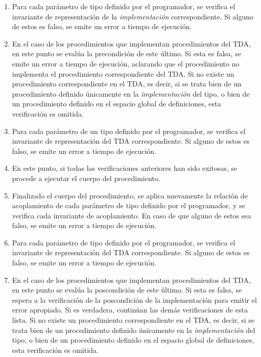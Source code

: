 {{\begin{enumerate}
  \item Para cada parámetro de tipo definido por el programador, se verifica
  el invariante de representación de la \textit{implementación} correspondiente.
  Si alguno de estos es falso, se emite un error a tiempo de ejecución.

  \item En el caso de los procedimientos que implementan procedimientos del TDA,
  en este punto se evalúa la precondición de este último. Si esta es falsa, se
  emite un error a tiempo de ejecución, aclarando que el procedimiento no
  implementa el procedimiento correspondiente del TDA. Si no existe un procedimiento
  correspondiente en el TDA, es decir, si se trata bien de un procedimiento
  definido únicamente en la \textit{implementación} del tipo, o bien de un
  procedimiento definido en el espacio global de definiciones, esta verificación
  es omitida.

  \item Para cada parámetro de un tipo definido por el programador, se verifica
  el invariante de representación del TDA correspondiente. Si alguno de estos es
  falso, se emite un error a tiempo de ejecución.

  \item En este punto, si todas las verificaciones anteriores han sido exitosas,
  se procede a ejecutar el cuerpo del procedimiento.

  \item Finalizado el cuerpo del procedimiento, se aplica nuevamente la relación
  de acoplamiento de cada parámetro de tipo definido por el programador, y se
  verifica cada invariante de acoplamiento. En caso de que alguno de estos sea
  falso, se emite un error a tiempo de ejecución.

  \item Para cada parámetro de tipo definido por el programador, se verifica el
  invariante de representación del TDA correspondiente. Si alguno de estos es
  falso, se emite un error a tiempo de ejecución.

  \item \label{posttda} En el caso de los procedimientos que implementan procedimientos del TDA,
  en este punto se evalúa la poscondición de este último. Si esta es falsa, se
  espera a la verificación de la poscondición de la implementación para emitir
  el error apropiado. Si es verdadera, continúan las demás verificaciones de
  esta lista. Si no existe un procedimiento correspondiente en el TDA, es decir,
  si se trata bien de un procedimiento definido únicamente en la
  \textit{implementación} del tipo, o bien de un procedimiento definido en el
  espacio global de definiciones, esta verificación es omitida.


\end{enumerate}}}
